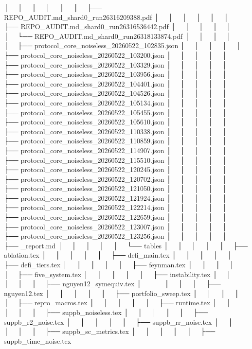 │   │       │   │   │   │   ├── REPO_AUDIT.md_shard0_run26316209388.pdf
│   │       │   │   │   │   ├── REPO_AUDIT.md_shard0_run26316536442.pdf
│   │       │   │   │   │   └── REPO_AUDIT.md_shard0_run26318133874.pdf
│   │       │   │   │   ├── protocol_core_noiseless_20260522_102835.json
│   │       │   │   │   ├── protocol_core_noiseless_20260522_103200.json
│   │       │   │   │   ├── protocol_core_noiseless_20260522_103329.json
│   │       │   │   │   ├── protocol_core_noiseless_20260522_103956.json
│   │       │   │   │   ├── protocol_core_noiseless_20260522_104401.json
│   │       │   │   │   ├── protocol_core_noiseless_20260522_104526.json
│   │       │   │   │   ├── protocol_core_noiseless_20260522_105134.json
│   │       │   │   │   ├── protocol_core_noiseless_20260522_105455.json
│   │       │   │   │   ├── protocol_core_noiseless_20260522_105610.json
│   │       │   │   │   ├── protocol_core_noiseless_20260522_110338.json
│   │       │   │   │   ├── protocol_core_noiseless_20260522_110859.json
│   │       │   │   │   ├── protocol_core_noiseless_20260522_114907.json
│   │       │   │   │   ├── protocol_core_noiseless_20260522_115510.json
│   │       │   │   │   ├── protocol_core_noiseless_20260522_120245.json
│   │       │   │   │   ├── protocol_core_noiseless_20260522_120702.json
│   │       │   │   │   ├── protocol_core_noiseless_20260522_121050.json
│   │       │   │   │   ├── protocol_core_noiseless_20260522_121924.json
│   │       │   │   │   ├── protocol_core_noiseless_20260522_122214.json
│   │       │   │   │   ├── protocol_core_noiseless_20260522_122659.json
│   │       │   │   │   ├── protocol_core_noiseless_20260522_123007.json
│   │       │   │   │   ├── protocol_core_noiseless_20260522_123256.json
│   │       │   │   │   ├── _report.md
│   │       │   │   │   └── tables
│   │       │   │   │       ├── ablation.tex
│   │       │   │   │       ├── defi_main.tex
│   │       │   │   │       ├── defi_tiers.tex
│   │       │   │   │       ├── feynman.tex
│   │       │   │   │       ├── five_system.tex
│   │       │   │   │       ├── instability.tex
│   │       │   │   │       ├── nguyen12_symequiv.tex
│   │       │   │   │       ├── nguyen12.tex
│   │       │   │   │       ├── portfolio_sweep.tex
│   │       │   │   │       ├── repro_macros.tex
│   │       │   │   │       ├── runtime.tex
│   │       │   │   │       ├── suppb_noiseless.tex
│   │       │   │   │       ├── suppb_r2_noise.tex
│   │       │   │   │       ├── suppb_rr_noise.tex
│   │       │   │   │       ├── suppb_sc_metrics.tex
│   │       │   │   │       ├── suppb_time_noise.tex
